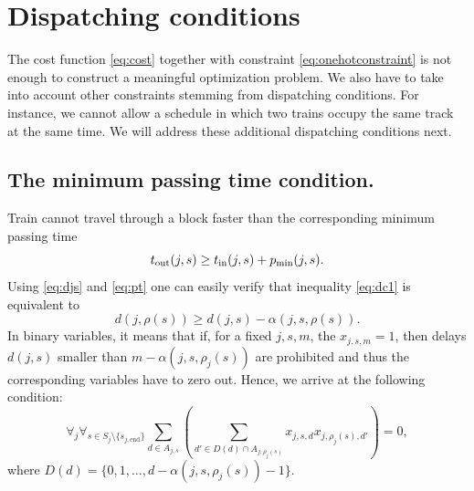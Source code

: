 \section{Dispatching conditions}
The cost function \eqref{eq:cost} together with constraint
\eqref{eq:onehotconstraint} is not enough to construct a meaningful
optimization problem. We also have to take into account other constraints
stemming from dispatching conditions. For instance, we cannot allow a schedule
in which two trains occupy the same track at the same time. We will address
these additional dispatching conditions next.

\subsection{The minimum passing time condition.}
Train cannot travel through a block faster than the corresponding minimum
passing time
\begin{equation}
  \label{eq:dc1}
  t_\text{out}(j, s) \ge t_\text{in}(j, s) + p_\text{min}(j, s).
\end{equation}
Using \eqref{eq:djs} and \eqref{eq:pt} one can easily verify that inequality
\eqref{eq:dc1} is equivalent to
\begin{equation}
  \label{eq:passingtime}
  d(j, \rho(s)) \ge d(j, s) - \alpha(j, s, \rho(s)).
\end{equation}
In binary variables, it means that if, for a fixed $j,s,m$, the $x_{j,s,m}=1$,
then delays $d(j,s)$ smaller than $m-\alpha(j, s, \rho_j(s))$ are prohibited
and thus the corresponding variables have to zero out. Hence, we arrive at the
following condition:
\begin{equation}
  \label{eq:qubo:passingtime}
  \forall_{j} \forall_{s \in S_j \setminus \{s_{{j,\text{end}}}\}}
  \sum_{d \in A_{j,s}}
  \left(
  \sum_{ d' \in D(d) \cap A_{j, \rho_j(s)}} x_{j, s, d}
  x_{j, \rho_j(s), d'} \right) = 0,
\end{equation}
where $D(d) = \{0, 1, \ldots, d - \alpha(j, s, \rho_j(s)) -1\}$.
